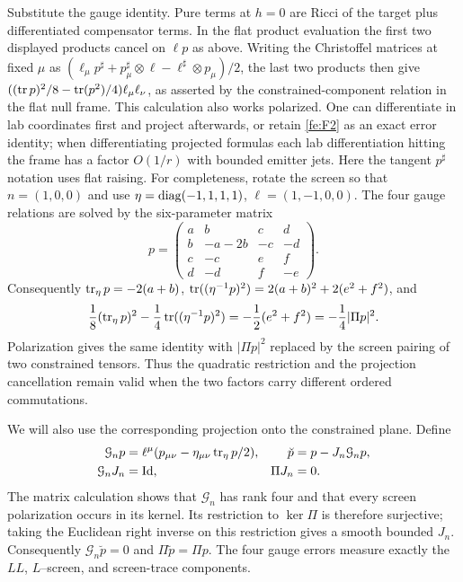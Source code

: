 Substitute the gauge identity. Pure terms at \(h=0\) are Ricci of the target plus differentiated compensator terms. In the flat product evaluation the first two displayed products cancel on \(\ell p\) as above. Writing the Christoffel matrices at fixed \(\mu\) as \((\ell_\mu p^\sharp+p_\mu^\sharp\otimes\ell-\ell^\sharp\otimes p_\mu)/2\), the last two products then give \((({\rm tr}\,p)^2/8-{ \rm tr}(p^2)/4)\ell_\mu\ell_\nu\), as asserted by the constrained-component relation in the flat null frame. This calculation also works polarized. One can differentiate in lab coordinates first and project afterwards, or retain \eqref{fe:F2} as an exact error identity; when differentiating projected formulas each lab differentiation hitting the frame has a factor \(O(1/r)\) with bounded emitter jets. Here the tangent \(p^\sharp\) notation uses flat raising.
For completeness, rotate the screen so that $n=(1,0,0)$ and use
$\eta=\operatorname{diag}(-1,1,1,1)$, $\ell=(1,-1,0,0)$.  The four gauge relations
are solved by the six-parameter matrix
\begin{equation*}
 p=\begin{pmatrix}
 a&b&c&d\\
 b&-a-2b&-c&-d\\
 c&-c&e&f\\
 d&-d&f&-e
 \end{pmatrix}.
\end{equation*}
Consequently $\operatorname{tr}_\eta p=-2(a+b)$,
$\operatorname{tr}((\eta^{-1}p)^2)=2(a+b)^2+2(e^2+f^2)$, and
\begin{equation*}
 \frac18(\operatorname{tr}_\eta p)^2-\frac14\operatorname{tr}((\eta^{-1}p)^2)
       =-\frac12(e^2+f^2)=-\frac14|\Pi p|^2.
\end{equation*}
Polarization gives the same identity with $|\Pi p|^2$ replaced by the
screen pairing of two constrained tensors.  Thus the quadratic restriction
and the projection cancellation remain valid when the two factors carry
different ordered commutations.

We will also use the corresponding projection onto the constrained plane.
Define
\begin{equation}\label{fe:gauge-projection}
\begin{aligned}
 \mathcal G_np&=\ell^\mu
       (p_{\mu\nu}-\eta_{\mu\nu}\operatorname{tr}_\eta p/2),
 &\breve p&=p-J_n\mathcal G_np,\\
 \mathcal G_nJ_n&=\operatorname{Id},
 &\Pi J_n&=0.
\end{aligned}
\end{equation}
The matrix calculation shows that $\mathcal G_n$ has rank four and that
every screen polarization occurs in its kernel.  Its restriction to
$\ker\Pi$ is therefore surjective; taking the Euclidean right inverse
on this restriction gives a smooth bounded $J_n$.  Consequently
$\mathcal G_n\breve p=0$ and $\Pi\breve p=\Pi p$.  The four gauge
errors measure exactly the $LL$, $L$--screen, and screen-trace components.


